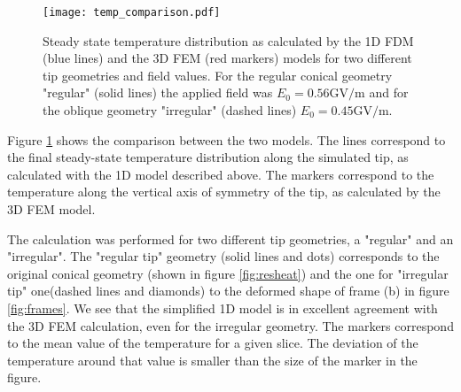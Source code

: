 \documentclass[%
 aps,
 prb,%
 amsmath,amssymb,
reprint,%
superscriptaddress,
]{revtex4-1}
\begin{document}
\begin{figure}[htbp]
	\centering
    \texttt{[image: temp\_comparison.pdf]}
    \caption{Steady state temperature distribution as calculated by the 1D FDM (blue lines) and the 3D FEM (red markers) models for two different tip geometries and field values. For the regular conical geometry "regular" (solid lines) the applied field was $E_{0}=0.56 \textrm{GV}/\textrm{m}$ and for the oblique geometry "irregular" (dashed lines) $E_0=0.45 \textrm{GV}/\textrm{m}$.}
    \label{fig:tempcomp}
\end{figure}

Figure \ref{fig:tempcomp} shows the comparison between the two models.
The lines correspond to the final steady-state temperature distribution along the simulated tip, as calculated with the 1D model described above.
The markers correspond to the temperature along the vertical axis of symmetry of the tip, as calculated by the 3D FEM model.

The calculation was performed for two different tip geometries, a "regular" and an "irregular". 
The "regular tip" geometry (solid lines and dots) corresponds to the original conical geometry (shown in figure \ref{fig:resheat}) and the one for "irregular tip" one(dashed lines and diamonds) to the deformed shape of frame (b) in figure \ref{fig:frames}.
We see that the simplified 1D model is in excellent agreement with the 3D FEM calculation, even for the irregular geometry.
The markers correspond to the mean value of the temperature for a given slice.
The deviation of the temperature around that value is smaller than the size of the marker in the figure. 

\pagebreak


\end{document}

